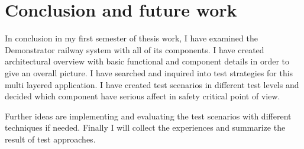 \chapter{Conclusion and future work}
In conclusion in my first semester of thesis work, I have examined the Demonstrator railway system with all of its components. I have created architectural overview with basic functional and component details in order to give an overall picture. I have searched and inquired into test strategies for this multi layered application. I have created test scenarios in different test levels and decided which component have serious affect in safety critical point of view.

Further ideas are implementing and evaluating the test scenarios with different techniques if needed. Finally I will collect the experiences and summarize the result of test approaches.